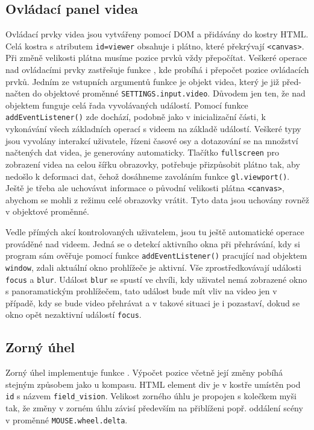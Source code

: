 \subsection{Ovládací panel videa}
Ovládací prvky videa jsou vytvářeny pomocí DOM a přidávány do kostry HTML. Celá kostra s atributem \texttt{id=viewer} obsahuje i plátno, které překrývají \texttt{<canvas>}. Při změně velikosti plátna musíme pozice prvků vždy přepočítat. Veškeré operace nad ovládacími prvky zastřešuje funkce \texttt{\createVideoControlls}, kde probíhá i přepočet pozice ovládacích prvků. Jedním ze vstupních argumentů funkce je objekt videa, který je již před-načten do objektové proměnné \texttt{SETTINGS.input.video}. Důvodem jen ten, že  nad objektem funguje celá řada vyvolávaných událostí. Pomocí funkce \texttt{addEventListener()} zde dochází, podobně jako v inicializační části, k vykonávání všech základních operací s videem na základě událostí. Veškeré typy jsou vyvolány interakcí uživatele, řízeni časové osy a dotazování se na množství načtených dat videa, je generovány automaticky. Tlačítko \texttt{fullscreen} pro zobrazení videa na celou šířku obrazovky, potřebuje přizpůsobit plátno tak, aby nedošlo k deformaci dat, čehož dosáhneme zavoláním funkce \texttt{gl.viewport()}. Ještě je třeba ale uchovávat informace o původní velikosti plátna \texttt{<canvas>}, abychom se mohli z režimu celé obrazovky vrátit. Tyto data jsou uchovány rovněž v objektové proměnné.

Vedle přímých akcí kontrolovaných uživatelem, jsou tu ještě  automatické operace prováděné nad videem. Jedná se o detekcí aktivního okna při přehrávání, kdy si program sám ověřuje pomocí funkce \texttt{addEventListener()}  pracující nad objektem \texttt{window}, zdali aktuální okno prohlížeče je aktivní. Vše zprostředkovávají události   \texttt{focus} a \texttt{blur}. Událost  \texttt{blur} se spustí ve chvíli, kdy uživatel nemá zobrazené okno s panoramatickým prohlížečem, tato událost bude mít vliv na video jen v případě, kdy se bude video přehrávat a v takové situaci je i pozastaví, dokud se okno opět nezaktivní událostí \texttt{focus}.

\subsection{Zorný úhel}
Zorný úhel implementuje funkce \texttt{\createFieldVision}. Výpočet pozice včetně její změny pobíhá stejným způsobem jako u kompasu. HTML element div je v kostře umístěn pod \texttt{id} s názvem  \texttt{field\_vision}. Velikost zorného úhlu je propojen s kolečkem myši tak, že změny v zorném úhlu závisí především na přiblíženi popř. oddálení scény v proměnné \texttt{MOUSE.wheel.delta}.




